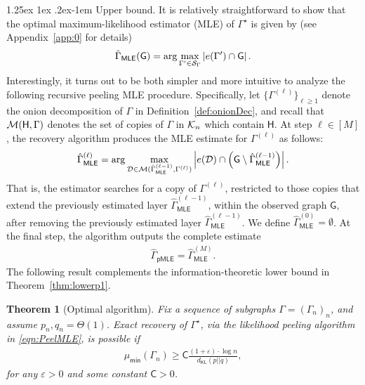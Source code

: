 \documentclass[12pt]{article}
\makeatletter
\newtheorem{theorem}{Theorem}
\newcommand{\abs}[1]{\left|#1\right|}
\newcommand {\pr} {\mathbb{P}}
\newcommand{\calD}{{\cal D}}
\newcommand{\calG}{{\cal G}}
\newcommand{\calK}{{\cal K}}
\newcommand{\calM}{{\cal M}}
\newcommand{\calS}{{\cal S}}
\newcommand{\s}[1]{\mathsf{#1}}
\renewcommand{\paragraph}{%
  \@startsection{paragraph}{4}%
  {\z@}{1.25ex \@plus 1ex \@minus .2ex}{-1em}%
  {\normalfont\normalsize\bfseries}%
}
\makeatother
\begin{document}
\paragraph{Upper bound.} It is relatively straightforward to show that the optimal maximum-likelihood estimator (MLE) of $\Gamma^\star$ is given by (see Appendix~\ref{app:0} for details)
\begin{align}
\hat{\Gamma}_{\s{MLE}}(\s{G}) = \arg\max_{\Gamma'\in\calS_{\Gamma}}\abs{e(\Gamma')\cap\s{G}}.\label{eqn:MLEGen}
\end{align}
Interestingly, it turns out to be both simpler and more intuitive to analyze the following recursive peeling MLE procedure. Specifically, let $\{\Gamma^{(\ell)}\}_{\ell\geq1}$ denote the onion decomposition of $\Gamma$ in Definition~\ref{def:onionDec}, and recall that $\calM(\s{H},\Gamma)$ denotes the set of copies of $\Gamma$ in $\calK_n$ which contain $\s{H}$. At step $\ell \in [M]$, the recovery algorithm produces the MLE estimate for $\Gamma^{(\ell)}$ as follows:
\begin{align}
\hat{\Gamma}^{(\ell)}_{\s{MLE}} = \arg\max_{\calD \in \calM(\hat{\Gamma}^{(\ell-1)}_{\s{MLE}},\Gamma^{(\ell)})} \abs{e(\calD) \cap \left(\s{G}\setminus\hat{\Gamma}^{(\ell-1)}_{\s{MLE}}\right)}.\label{eqn:PeelMLE0}
\end{align}
That is, the estimator searches for a copy of $\Gamma^{(\ell)}$, restricted to those copies that extend the previously estimated layer $\hat{\Gamma}^{(\ell-1)}_{\s{MLE}}$, within the observed graph $\s{G}$, after removing the previously estimated layer $\hat{\Gamma}^{(\ell-1)}_{\s{MLE}}$. We define $\hat{\Gamma}^{(0)}_{\s{MLE}}=\emptyset$. At the final step, the algorithm outputs the complete estimate
\begin{align}
    \hat{\Gamma}_{\s{pMLE}} = \hat{\Gamma}^{(M)}_{\s{MLE}}.\label{eqn:PeelMLE}
\end{align}
The following result complements the information-theoretic lower bound in Theorem~\ref{thm:lowerp1}.
\begin{theorem}[Optimal algorithm]\label{thm:MLE}
Fix a sequence of subgraphs $\Gamma=(\Gamma_n)_n$, and assume $p_n,q_n=\Theta(1)$. 
Exact recovery of $\Gamma^\star$, via the likelihood peeling algorithm in \eqref{eqn:PeelMLE}, is possible if
\begin{align}
    \mu_{\s{min}}(\Gamma_n)\geq \s{C}\frac{(1+\varepsilon)\cdot \log n}{d_{\s{KL}}(p||q)},\label{eqn:MLEcond}
\end{align}
for any $\varepsilon>0$ and some constant $\s{C}>0$. %
\end{theorem}
\end{document}
